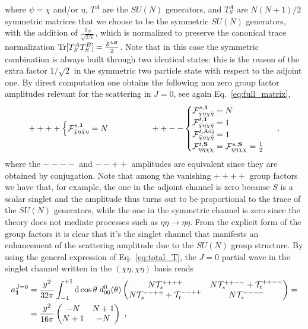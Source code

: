 \documentclass[a4paper,11pt]{article}
\newcommand{\nn}{\nonumber}
\begin{document}
where $\psi=\chi$ and/or $\eta$, $T^A$ are the $SU(N)$ generators, and $T^A_S$ are $N(N+1)/2$ symmetric matrices that we choose to be
the symmetric $SU(N)$ generators, with the addition of $\frac{\mathbb{1}_N}{\sqrt{2N}}$, which is normalized to preserve the canonical trace normalization ${\rm Tr}[T_S^A T_S^B]=\frac{\delta^{AB}}{2}$. Note that in this case the  symmetric combination is always built through two identical states: this is the reason of the extra factor $1/\sqrt 2$ in the symmetric two particle state with respect to the adjoint one. By  direct computation one obtains the following non zero group factor amplitudes relevant for the scattering in $J=0$, see again Eq.~\eqref{eq:full_matrix},
\begin{align}\label{eq:group_model1_J0}
++++
\begin{cases}
{\cal F}^{s,{\bf 1}}_{\bar \chi \eta \bar \chi \eta} = N
\end{cases}
%
\qquad \qquad
++--
\begin{cases}
{\cal F}^{s, \bf{1}}_{\bar \chi \eta  \chi \bar \eta} = N \\
{\cal F}^{t, \bf{1}}_{\bar \chi \eta  \chi \bar \eta} = 1 \\
{\cal F}^{t,{\rm Adj}}_{\bar \chi \eta  \chi \bar \eta} =1 \\
{\cal F}^{t,{\rm {\bf S}}}_{\eta\eta\chi\chi} = {\cal F}^{u,{\rm {\bf S}}}_{\eta\eta\chi\chi}  = \frac{1}{2} \\
\end{cases} \ ,
\end{align}
where the $----$ and $--++$ amplitudes are equivalent since they are obtained by conjugation.
Note that among the vanishing $++++$ group factors we have that, for example, the one in the adjoint channel is zero because $S$ is a scalar singlet and the amplitude thus turns out to be proportional to the trace of the $SU(N)$ generators, while the one in the symmetric channel is zero since the theory does not mediate processes such as $\eta\eta\to\eta\eta$. 
From the explicit form of the group factors it is clear that it's the singlet channel that manifests an enhancement of the scattering amplitude due to the $SU(N)$ group structure. By using the general expression
of Eq.~\eqref{eq:total_T}, the $J=0$ partial wave in the singlet channel written in the $(\bar\chi \eta, \chi\bar \eta)$ basis reads
\begin{align}
\label{eq:model1_j0}
a^{J=0}_{{\bf 1}}& =\frac{y^2}{32\pi} \int_{-1}^{+1}{\rm d}\cos\theta \; d^0_{00}(\theta)
\begin{pmatrix}
N {\cal T}^{++++}_s  & N {\cal T}^{++--}_s  + {\cal T}^{++--}_t \\
 N {\cal T}^{--++}_s  + {\cal T}^{--++}_t & N {\cal T}^{----}_s 
\end{pmatrix} = \nn \\
& =  \frac{ y^2 }{16\pi}
\begin{pmatrix}
- N & N+1 \\
N+1 & - N
\end{pmatrix} \ , 
\end{align}
\end{document}
